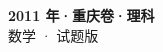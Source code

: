 \documentclass[zihao=-4, a4paper]{ctexart}
\begin{document}
\begin{center}
  {\Large\bfseries 2011 年·重庆卷·理科}\\[4pt]
  {\large 数学 · 试题版}
\end{center}
\medskip
{}

\end{document}
